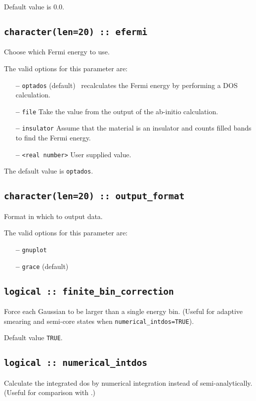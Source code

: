 \documentclass[a4paper,11pt,twoside]{book}
\begin{document}
{Default value is 0.0.

\subsection[compute\_efermi]{{\tt character(len=20) :: efermi}}
Choose which Fermi energy to use.

The valid options for this parameter are:
\begin{itemize}
\item[{\bf --}]  \verb#optados# (default) \optados\ recalculates the Fermi energy by performing a DOS calculation.
\item[{\bf --}]  \verb#file# Take the value from the output of the ab-initio calculation.
\item[{\bf --}]  \verb#insulator# Assume that the material is an insulator and counts filled bands to find the Fermi energy.
\item[{\bf --}]  \verb#<real number># User supplied value.
\end{itemize}

The default value is {\tt optados}.


\subsection[output\_format]{\tt character(len=20) :: output\_format}
Format in which to output data.

The valid options for this parameter are:
\begin{itemize}
\item[{\bf --}]  \verb#gnuplot#
\item[{\bf --}]  \verb#grace# (default)
\end{itemize}

\subsection[finite\_bin\_correction]{\tt logical :: finite\_bin\_correction}
Force each Gaussian to be larger than a single energy bin. (Useful for adaptive smearing and semi-core states when \verb#numerical_intdos=TRUE#).

Default value \verb#TRUE#.

\subsection[numerical\_intdos]{\tt logical :: numerical\_intdos}
Calculate the integrated dos by numerical integration instead of semi-analytically. (Useful for comparison with \lindos.)

}
\end{document}
